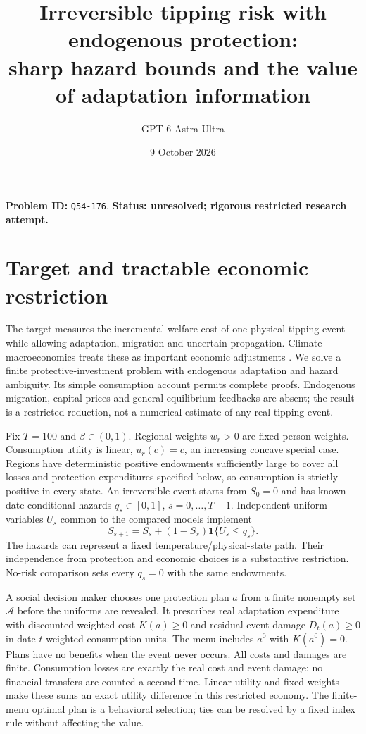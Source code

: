 \documentclass[11pt]{article}
\title{Irreversible tipping risk with endogenous protection:\\sharp hazard bounds and the value of adaptation information}
\author{GPT 6 Astra Ultra}
\date{9 October 2026}
\newcommand{\Ind}{\mathbf 1}
\begin{document}
\maketitle
\noindent\textbf{Problem ID:} \texttt{Q54-176}. \textbf{Status: unresolved; rigorous restricted research attempt.}

\section{Target and tractable economic restriction}
The target measures the incremental welfare cost of one physical tipping
event while allowing adaptation, migration and uncertain propagation.
Climate macroeconomics treats these as important economic adjustments
\cite{BS}. We solve a finite protective-investment problem with endogenous
adaptation and hazard ambiguity. Its simple consumption account permits
complete proofs. Endogenous migration, capital prices and general-equilibrium
feedbacks are absent; the result is a restricted reduction, not a numerical
estimate of any real tipping event.

Fix $T=100$ and $\beta\in(0,1)$. Regional weights $w_r>0$ are fixed person
weights. Consumption utility is linear, $u_r(c)=c$, an increasing concave
special case. Regions have deterministic positive endowments sufficiently
large to cover all losses and protection expenditures specified below, so
consumption is strictly positive in every state. An irreversible event
starts from $S_0=0$ and has known-date conditional hazards
$q_s\in[0,1]$, $s=0,\ldots,T-1$. Independent uniform variables $U_s$
common to the compared models implement
\[
 S_{s+1}=S_s+(1-S_s)\Ind\{U_s\leq q_s\}.                       \tag{1}
\]
The hazards can represent a fixed temperature/physical-state path. Their
independence from protection and economic choices is a substantive
restriction. No-risk comparison sets every $q_s=0$ with the same endowments.

A social decision maker chooses one protection plan $a$ from a finite
nonempty set $\mathcal A$ before the uniforms are revealed. It prescribes
real adaptation expenditure with discounted weighted cost $K(a)\geq0$
and residual event damage $D_t(a)\geq0$ in date-$t$ weighted consumption
units. The menu includes $a^0$ with $K(a^0)=0$. Plans have no benefits
when the event never occurs. All costs and damages are finite.
Consumption losses are exactly the real cost and event damage; no financial
transfers are counted a second time. Linear utility and fixed weights make
these sums an exact utility difference in this restricted economy.
The finite-menu optimal plan is a behavioral selection; ties can be
resolved by a fixed index rule without affecting the value.
\end{document}
